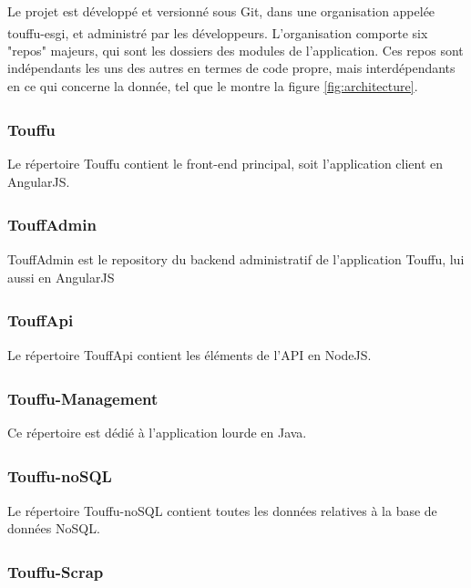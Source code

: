 \documentclass[conference]{IEEEtran}
\newcommand{\bibRef}[1]
{\textsuperscript{\cite{#1}}}
\begin{document}
Le projet est développé et versionné sous Git, dans une organisation appelée touffu-esgi\bibRef{touffu-esgi}, et administré par les développeurs. L'organisation comporte six "repos" majeurs, qui sont les dossiers des modules de l'application. Ces repos sont indépendants les uns des autres en termes de code propre, mais interdépendants en ce qui concerne la donnée, tel que le montre la figure \ref{fig:architecture}.\\

\subsubsection*{Touffu\bibRef{Touffu} }

Le répertoire Touffu contient le front-end principal, soit l'application client en AngularJS.\\

\subsubsection*{TouffAdmin\bibRef{TouffAdmin} }

TouffAdmin est le repository du backend administratif de l'application Touffu, lui aussi en AngularJS\\

\subsubsection*{TouffApi\bibRef{TouffApi} }

Le répertoire TouffApi contient les éléments de l'API en NodeJS.\\

\subsubsection*{Touffu-Management\bibRef{Touffu-Management} }

Ce répertoire est dédié à l'application lourde en Java.\\

\subsubsection*{Touffu-noSQL\bibRef{Touffu-noSQL} }

Le répertoire Touffu-noSQL contient toutes les données relatives à la base de données NoSQL.\\

\subsubsection*{Touffu-Scrap\bibRef{Touffu-Scrap} }
\end{document}
